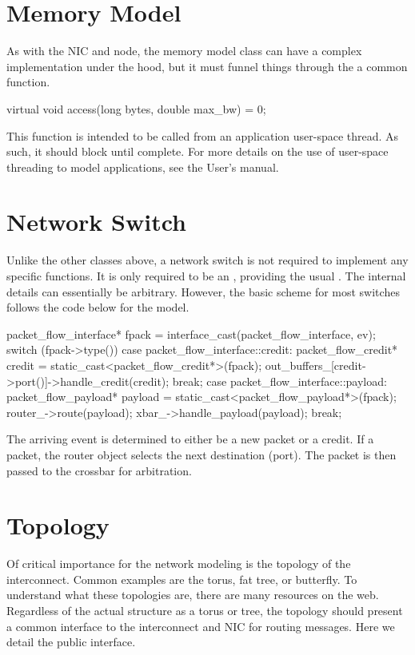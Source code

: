 \section{Memory Model}
As with the NIC and node, the memory model class can have a complex implementation under the hood,
but it must funnel things through the a common function.

\begin{CppCode}
virtual void
access(long bytes, double max_bw) = 0;
\end{CppCode}

This function is intended to be called from an application user-space thread.
As such, it should block until complete.
For more details on the use of user-space threading to model applications,
see the User's manual.


\section{Network Switch}
Unlike the other classes above, a network switch is not required to implement any specific functions.
It is only required to be an , providing the usual .
The internal details can essentially be arbitrary.
However, the basic scheme for most switches follows the code below for the  model.

\begin{CppCode}
  packet_flow_interface* fpack = interface_cast(packet_flow_interface, ev);
  switch (fpack->type()) {
    case packet_flow_interface::credit: {
      packet_flow_credit* credit = static_cast<packet_flow_credit*>(fpack);
      out_buffers_[credit->port()]->handle_credit(credit);
      break;
    }
    case packet_flow_interface::payload: {
      packet_flow_payload* payload = static_cast<packet_flow_payload*>(fpack);
      router_->route(payload);
      xbar_->handle_payload(payload);
      break;
    }
  }
\end{CppCode}
The arriving event is determined to either be a new packet or a credit.
If a packet, the router object selects the next destination (port).
The packet is then passed to the crossbar for arbitration.

\section{Topology}
\label{sec:topology}
Of critical importance for the network modeling is the topology of the interconnect.
Common examples are the torus, fat tree, or butterfly.
To understand what these topologies are, there are many resources on the web.
Regardless of the actual structure as a torus or tree, the topology should present a common interface to the interconnect and NIC for routing messages.
Here we detail the public interface.
